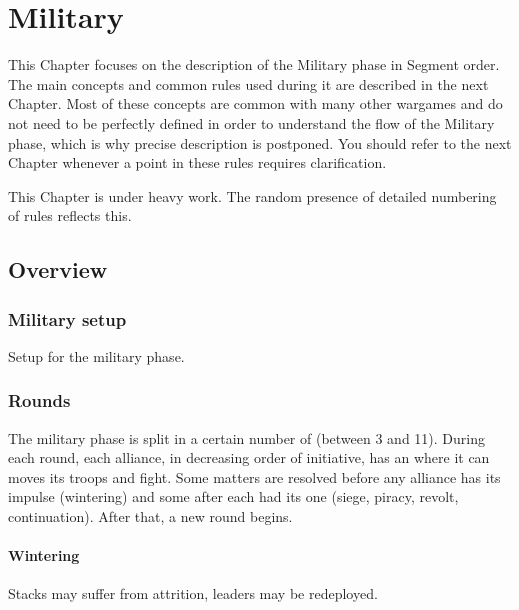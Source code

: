 
\chapter{Military}\label{chapter:MilitaryRules}

\begin{designnote}
  This Chapter focuses on the description of the Military phase in Segment
  order. The main concepts and common rules used during it are described in
  the next Chapter. Most of these concepts are common with many other wargames
  and do not need to be perfectly defined in order to understand the flow of
  the Military phase, which is why precise description is postponed. You
  should refer to the next Chapter whenever a point in these rules requires
  clarification.
\end{designnote}

\begin{todo}
  This Chapter is under heavy work. The random presence of detailed numbering
  of rules reflects this.
\end{todo}

\section{Overview}
\aparag[Sequence]
\MilitaryDetails

\subsection{Military setup}
Setup for the military phase.

\subsection{Rounds}
The military phase is split in a certain number of  (between 3
and 11). During each round, each alliance, in decreasing order of initiative,
has an  where it can moves its troops and fight. Some matters
are resolved before any alliance has its impulse (wintering) and some after
each had its one (siege, piracy, revolt, continuation). After that, a new
round begins.

\subsubsection{Wintering}
Stacks may suffer from attrition, leaders may be redeployed.

